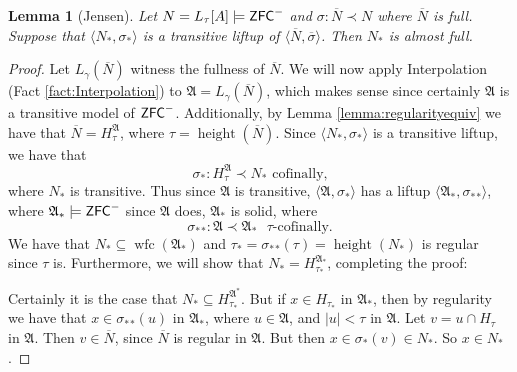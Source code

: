 \documentclass{amsart}
\newtheorem{lemma}[theorem]{Lemma}
\theoremstyle{definition}
\theoremstyle{remark}
\newcommand{\N}{{\overline{N}}}
\newcommand{\ZFC}{\textup{\ensuremath{\textsf{ZFC}}}}
\DeclareMathOperator{\height}{height}
\DeclareMathOperator{\wfc}{wfc}
\begin{document}
\begin{lemma}[Jensen]\label{lemma:liftupfull} Let $N =L_\tau[A] \models \ZFC^-$ and $\sigma: \N \prec N$ where $\N$ is full. Suppose that $\langle N_*, \sigma_* \rangle$ is a transitive liftup of $\langle \N, \overline \sigma \rangle$. Then $N_*$ is almost full. \end{lemma}
\begin{proof}
	Let $L_\gamma(\N)$ witness the fullness of $\N$. We will now apply Interpolation (Fact \ref{fact:Interpolation}) to $\mathfrak A= L_\gamma(\N)$, which makes sense since certainly $\mathfrak A$ is a transitive model of $\ZFC^-$. Additionally, by Lemma \ref{lemma:regularityequiv} we have that $\N = H_\tau^{\mathfrak A}$, where $\tau = \height(\N)$. 
	Since $\langle N_*, \sigma_* \rangle$ is a transitive liftup, we have that $$\sigma_*: H_\tau^{\mathfrak A} \prec N_* \text{ cofinally,}$$ where $N_*$ is transitive. Thus since $\mathfrak A$ is transitive, $\langle \mathfrak A, \sigma_* \rangle$ has a liftup $\langle \mathfrak A_*, {\sigma_*}_* \rangle$, where $\mathfrak A_* \models \ZFC^-$ since $\mathfrak A$ does, $\mathfrak A_*$ is solid, where $${\sigma_*}_* : \mathfrak A \prec \mathfrak A_* \text{ $\tau$-cofinally.}$$ 
	We have that  $N_* \subseteq \wfc({\mathfrak A}_*)$ and $\tau_*= {\sigma_*}_*(\tau)=\height(N_*)$ is regular since $\tau$ is. Furthermore, we will show that $N_* = H_{\tau_*}^{\mathfrak A_*}$, completing the proof:
	
	Certainly it is the case that $N_* \subseteq H_{\tau_*}^{\mathfrak A^*}$. 
	But if $x \in H_{\tau_*}$ in $\mathfrak A_*$, then by regularity we have that $x \in {\sigma_*}_*(u)$ in $\mathfrak A_*$, where $u \in \mathfrak A$, and $|u| < \tau$ in $\mathfrak A$. Let $v=u \cap H_\tau$ in $\mathfrak A$. Then $v \in \N$, since $\N$ is regular in $\mathfrak A$. But then $x \in \sigma_*(v) \in N_*$. So $x \in N_*$.
\end{proof}
\end{document}
